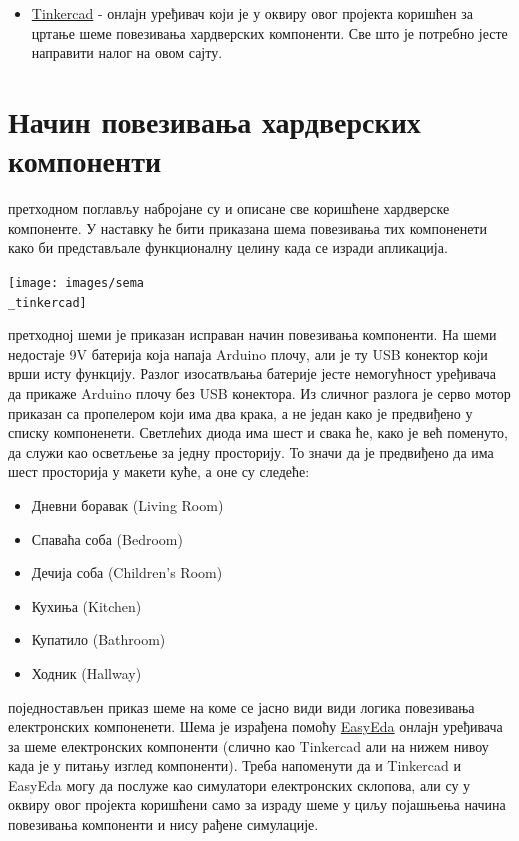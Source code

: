 \documentclass[12pt]{article}
\begin{document}
\begin{itemize}
  \item \href{https://www.tinkercad.com/dashboard}{Tinkercad} - онлајн уређивач који је у оквиру овог пројекта коришћен за цртање шеме повезивања хардверских компоненти. Све што је потребно јесте направити налог на овом сајту.
\end{itemize}



\newpage
\section{Начин повезивања хардверских компоненти}
 претходном поглављу набројане су и описане све коришћене хардверске компоненте. У наставку ће бити приказана шема повезивања тих компоненети како би представљале функционалну целину када се изради апликација.    
\begin{center}
    \centering 
    \texttt{[image: images/sema\\\_tinkercad]}
\end{center}
\vspace{0.5cm}
\indent{} претходној шеми је приказан исправан начин повезивања компоненти. На шеми недостаје 9V батерија која напаја Arduino плочу, али је ту USB конектор који врши исту функцију. Разлог изосатвљања батерије јесте немогућност уређивача да прикаже Arduino плочу без USB конектора. Из сличног разлога је серво мотор приказан са пропелером који има два крака, а не један како је предвиђено у списку компоненети. Светлећих диода има шест и свака ће, како је већ поменуто, да служи као осветљење за једну просторију. То значи да је предвиђено да има шест просторија у макети куће, а оне су следеће:
\begin{itemize}
  \item Дневни боравак (Living Room)
  \item Спаваћа соба (Bedroom)
  \item Дечија соба (Children's Room)
  \item Кухиња (Kitchen)
  \item Купатило (Bathroom)
  \item Ходник (Hallway)
\end{itemize}
\vspace{0.5cm}
\indent{} поједностављен приказ шеме на коме се јасно види види логика повезивања електронских компоненети. Шема је израђена помоћу \href{https://easyeda.com/}{EasyEda} онлајн уређивача за шеме електронских компоненти (слично као Tinkercad али на нижем нивоу када је у питању изглед компоненти). Треба напоменути да и Tinkercad и EasyEda могу да послуже као симулатори електронских склопова, али су у оквиру овог пројекта коришћени само за израду шеме у циљу појашњења начина повезивања компоненти и нису рађене симулације.
\end{document}
